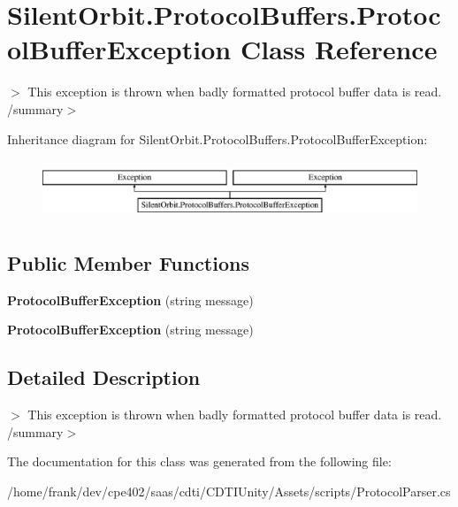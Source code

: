 \hypertarget{class_silent_orbit_1_1_protocol_buffers_1_1_protocol_buffer_exception}{}\section{Silent\+Orbit.\+Protocol\+Buffers.\+Protocol\+Buffer\+Exception Class Reference}
\label{class_silent_orbit_1_1_protocol_buffers_1_1_protocol_buffer_exception}


$>$ This exception is thrown when badly formatted protocol buffer data is read. /summary$>$  


Inheritance diagram for Silent\+Orbit.\+Protocol\+Buffers.\+Protocol\+Buffer\+Exception\+:\begin{figure}[H]
\begin{center}
\leavevmode
\includegraphics[height=1.794872cm]{class_silent_orbit_1_1_protocol_buffers_1_1_protocol_buffer_exception}
\end{center}
\end{figure}
\subsection*{Public Member Functions}
\begin{DoxyCompactItemize}
\item 
\hypertarget{class_silent_orbit_1_1_protocol_buffers_1_1_protocol_buffer_exception_a6028c070a3feff745b455ff61e9fd616}{}{\bfseries Protocol\+Buffer\+Exception} (string message)\label{class_silent_orbit_1_1_protocol_buffers_1_1_protocol_buffer_exception_a6028c070a3feff745b455ff61e9fd616}

\item 
\hypertarget{class_silent_orbit_1_1_protocol_buffers_1_1_protocol_buffer_exception_a6028c070a3feff745b455ff61e9fd616}{}{\bfseries Protocol\+Buffer\+Exception} (string message)\label{class_silent_orbit_1_1_protocol_buffers_1_1_protocol_buffer_exception_a6028c070a3feff745b455ff61e9fd616}

\end{DoxyCompactItemize}


\subsection{Detailed Description}
$>$ This exception is thrown when badly formatted protocol buffer data is read. /summary$>$ 

The documentation for this class was generated from the following file\+:\begin{DoxyCompactItemize}
\item 
/home/frank/dev/cpe402/saas/cdti/\+C\+D\+T\+I\+Unity/\+Assets/scripts/Protocol\+Parser.\+cs\end{DoxyCompactItemize}
